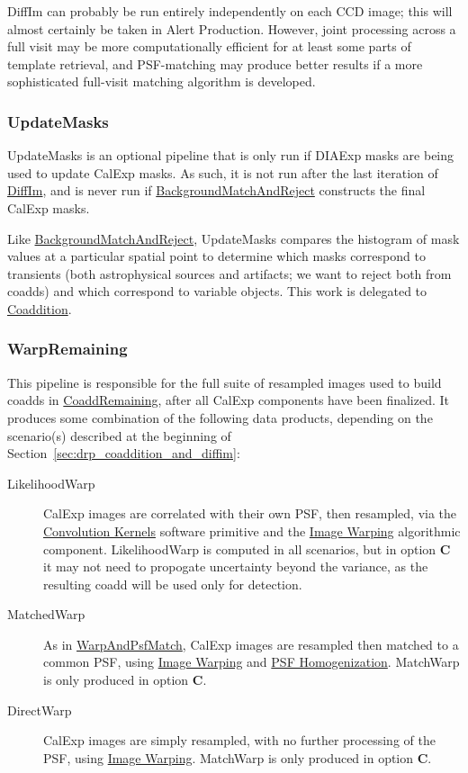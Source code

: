 DiffIm can probably be run entirely independently on each CCD image; this will almost certainly be taken in Alert Production.  However, joint processing across a full visit may be more computationally efficient for at least some parts of template retrieval, and PSF-matching may produce better results if a more sophisticated full-visit matching algorithm is developed.

\subsubsection{UpdateMasks}
\label{sec:drpUpdateMasks}

UpdateMasks is an optional pipeline that is only run if DIAExp masks are being used to update CalExp masks.  As such, it is not run after the last iteration of \hyperref[sec:drpDiffIm]{DiffIm}, and is never run if \hyperref[sec:drpBackgroundMatchAndReject]{BackgroundMatchAndReject} constructs the final CalExp masks.

Like \hyperref[sec:drpBackgroundMatchAndReject]{BackgroundMatchAndReject}, UpdateMasks compares the histogram of mask values at a particular spatial point to determine which masks correspond to transients (both astrophysical sources and artifacts; we want to reject both from coadds) and which correspond to variable objects.  This work is delegated to \hyperref[sec:acCoaddition]{Coaddition}.

\subsubsection{WarpRemaining}
\label{sec:drpWarpRemaining}

This pipeline is responsible for the full suite of resampled images used to build coadds in \hyperref[sec:drpCoaddRemaining]{CoaddRemaining}, after all CalExp components have been finalized.  It produces some combination of the following data products, depending on the scenario(s) described at the beginning of Section~\ref{sec:drp_coaddition_and_diffim}:
\begin{description}
\item[LikelihoodWarp] CalExp images are correlated with their own PSF, then resampled, via the \hyperref[sec:spKernels]{Convolution Kernels} software primitive and the \hyperref[sec:acWarping]{Image Warping} algorithmic component.  LikelihoodWarp is computed in all scenarios, but in option \textbf{C} it may not need to propogate uncertainty beyond the variance, as the resulting coadd will be used only for detection.
\item[MatchedWarp] As in \hyperref[sec:drpWarpAndPsfMatch]{WarpAndPsfMatch}, CalExp images are resampled then matched to a common PSF, using \hyperref[sec:acWarping]{Image Warping} and \hyperref[sec:acPSFHomogenization]{PSF Homogenization}.  MatchWarp is only produced in option \textbf{C}.
\item[DirectWarp] CalExp images are simply resampled, with no further processing of the PSF, using \hyperref[sec:acWarping]{Image Warping}.  MatchWarp is only produced in option \textbf{C}.
\end{description}

